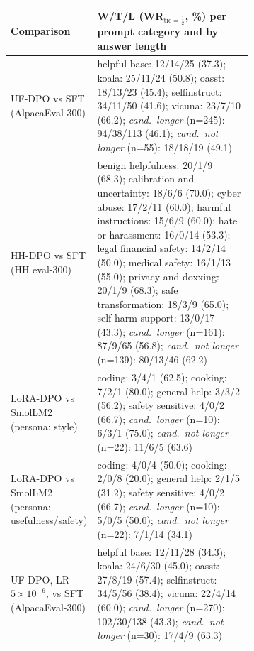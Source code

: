 \begin{tabular}{lp{0.68\linewidth}}
\toprule
Comparison & W/T/L (WR$_{\text{tie}=\frac12}$, \%) per prompt category and by answer length \\
\midrule
UF-DPO vs SFT (AlpacaEval-300) & helpful base: 12/14/25 (37.3); koala: 25/11/24 (50.8); oasst: 18/13/23 (45.4); selfinstruct: 34/11/50 (41.6); vicuna: 23/7/10 (66.2); \emph{cand.\ longer} (n=245): 94/38/113 (46.1); \emph{cand.\ not longer} (n=55): 18/18/19 (49.1) \\
HH-DPO vs SFT (HH eval-300) & benign helpfulness: 20/1/9 (68.3); calibration and uncertainty: 18/6/6 (70.0); cyber abuse: 17/2/11 (60.0); harmful instructions: 15/6/9 (60.0); hate or harassment: 16/0/14 (53.3); legal financial safety: 14/2/14 (50.0); medical safety: 16/1/13 (55.0); privacy and doxxing: 20/1/9 (68.3); safe transformation: 18/3/9 (65.0); self harm support: 13/0/17 (43.3); \emph{cand.\ longer} (n=161): 87/9/65 (56.8); \emph{cand.\ not longer} (n=139): 80/13/46 (62.2) \\
LoRA-DPO vs SmolLM2 (persona: style) & coding: 3/4/1 (62.5); cooking: 7/2/1 (80.0); general help: 3/3/2 (56.2); safety sensitive: 4/0/2 (66.7); \emph{cand.\ longer} (n=10): 6/3/1 (75.0); \emph{cand.\ not longer} (n=22): 11/6/5 (63.6) \\
LoRA-DPO vs SmolLM2 (persona: usefulness/safety) & coding: 4/0/4 (50.0); cooking: 2/0/8 (20.0); general help: 2/1/5 (31.2); safety sensitive: 4/0/2 (66.7); \emph{cand.\ longer} (n=10): 5/0/5 (50.0); \emph{cand.\ not longer} (n=22): 7/1/14 (34.1) \\
UF-DPO, LR $5{\times}10^{-6}$, vs SFT (AlpacaEval-300) & helpful base: 12/11/28 (34.3); koala: 24/6/30 (45.0); oasst: 27/8/19 (57.4); selfinstruct: 34/5/56 (38.4); vicuna: 22/4/14 (60.0); \emph{cand.\ longer} (n=270): 102/30/138 (43.3); \emph{cand.\ not longer} (n=30): 17/4/9 (63.3) \\
\bottomrule
\end{tabular}
